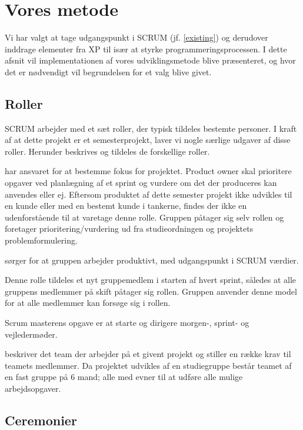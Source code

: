 { %

\newcommand{\XPhere}{\marginpar{\textbf{\footnotesize XP}}}

\section{Vores metode}\label{ourmethod}
Vi har valgt at tage udgangspunkt i SCRUM (jf. \cref{existing}) og derudover inddrage elementer fra XP til især at styrke programmeringsprocessen.
I dette afsnit vil implementationen af vores udviklingsmetode blive præsenteret, og hvor det er nødvendigt vil begrundelsen for et valg blive givet.

\subsection{Roller}
SCRUM arbejder med et sæt roller, der typisk tildeles bestemte personer.
I kraft af at dette projekt er et semesterprojekt, laver vi nogle særlige udgaver af disse roller.
Herunder beskrives og tildeles de forskellige roller.
\begin{description}
{har ansvaret for at bestemme fokus for projektet.
Product owner skal prioritere opgaver ved planlægning af et sprint og vurdere om det der produceres kan anvendes eller ej.}
{Eftersom produktet af dette semester projekt ikke udvikles til en kunde eller med en bestemt kunde i tankerne, findes der ikke en udenforstående til at varetage denne rolle.
Gruppen påtager sig selv rollen og foretager prioritering/vurdering ud fra studieordningen og projektets problemformulering.}

{sørger for at gruppen arbejder produktivt, med udgangspunkt i SCRUM værdier.}
{Denne rolle tildeles et nyt gruppemedlem i starten af hvert sprint, således at alle gruppens medlemmer på skift påtager sig rollen.
Gruppen anvender denne model for at alle medlemmer kan forsøge sig i rollen.


Scrum masterens opgave er at starte og dirigere morgen-, sprint- og vejledermøder.}

{beskriver det team der arbejder på et givent projekt og stiller en række krav til teamets medlemmer.}
{Da projektet udvikles af en studiegruppe består teamet af en fast gruppe på 6 mand; alle med evner til at udføre alle mulige arbejdsopgaver.}
\end{description}

\subsection{Ceremonier}

}
